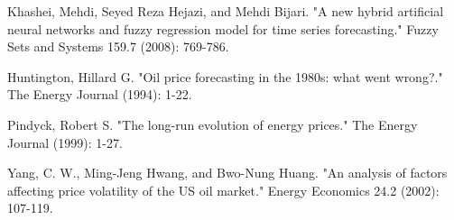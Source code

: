 \documentclass[runningheads]{llncs}
\begin{document}
\begin{thebibliography}{4}
Khashei, Mehdi, Seyed Reza Hejazi, and Mehdi Bijari. "A new hybrid artificial neural networks and fuzzy regression model for time series forecasting." Fuzzy Sets and Systems 159.7 (2008): 769-786.

 Huntington, Hillard G. "Oil price forecasting in the 1980s: what went wrong?." The Energy Journal (1994): 1-22.

 Pindyck, Robert S. "The long-run evolution of energy prices." The Energy Journal (1999): 1-27.

 Yang, C. W., Ming-Jeng Hwang, and Bwo-Nung Huang. "An analysis of factors affecting price volatility of the US oil market." Energy Economics 24.2 (2002): 107-119.




\end{thebibliography}
\end{document}
